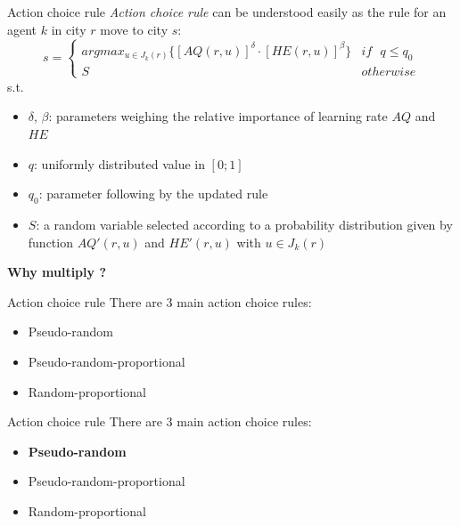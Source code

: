 \documentclass[aspectratio=169,xcolor=dvipsnames]{beamer}
\begin{document}
\begin{frame}{Action choice rule}
    \textit{Action choice rule} can be understood easily as the rule for an agent $k$ in city $r$ move to city $s$:
    \begin{equation}
        s = \begin{cases}argmax_{u\in J_{k}(r)}\{\left[ AQ(r, u)\right]^\delta \cdot\left[HE(r, u)\right]^\beta\}&if\text{ } q\leq q_0\\S&otherwise\end{cases}
    \end{equation}
    s.t.
    \begin{itemize}
        \item $\delta$, $\beta$: parameters weighing the relative importance of learning rate $AQ$ and $HE$
        \item $q$: uniformly distributed value in $\left[ 0; 1\right]$
        \item $q_0$: parameter following by the updated rule
        \item $S$: a random variable selected according to a probability distribution given by function $AQ'(r, u)$ and $HE'(r, u)$ with $u \in J_k(r)$
    \end{itemize}
\end{frame}

\begin{frame}
    \huge\centering\textbf{Why multiply ?}
\end{frame}

\begin{frame}{Action choice rule}
    There are 3 main action choice rules:
    \begin{itemize}
        \item Pseudo-random
        \item Pseudo-random-proportional
        \item Random-proportional
    \end{itemize}
\end{frame}

\begin{frame}{Action choice rule}
    There are 3 main action choice rules:
    \begin{itemize}
        \item \textbf{Pseudo-random}
        \item Pseudo-random-proportional
        \item Random-proportional
    \end{itemize}
\end{frame}
\end{document}
